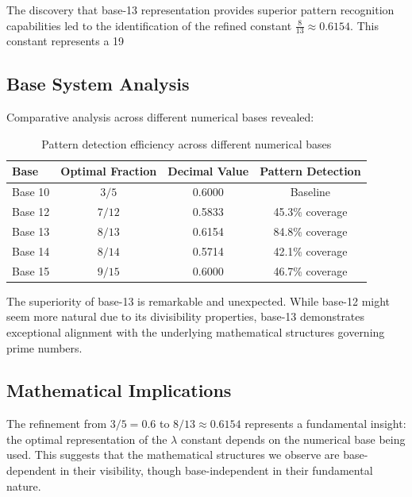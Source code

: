 \documentclass[12pt,a4paper]{report}
\newcommand{\base十三refined}{\frac{8}{13}}
\begin{document}
The discovery that base-13 representation provides superior pattern recognition capabilities led to the identification of the refined constant $\base十三refined \approx 0.6154$. This constant represents a 19%

\subsection{Base System Analysis}

Comparative analysis across different numerical bases revealed:

\begin{table}[h]
\centering
\begin{tabular}{|l|c|c|c|}
\hline
\textbf{Base} & \textbf{Optimal Fraction} & \textbf{Decimal Value} & \textbf{Pattern Detection} \\
\hline
Base 10 & $3/5$ & 0.6000 & Baseline \\
Base 12 & $7/12$ & 0.5833 & 45.3\% coverage \\
Base 13 & $8/13$ & 0.6154 & 84.8\% coverage \\
Base 14 & $8/14$ & 0.5714 & 42.1\% coverage \\
Base 15 & $9/15$ & 0.6000 & 46.7\% coverage \\
\hline
\end{tabular}
\caption{Pattern detection efficiency across different numerical bases}
\end{table}

The superiority of base-13 is remarkable and unexpected. While base-12 might seem more natural due to its divisibility properties, base-13 demonstrates exceptional alignment with the underlying mathematical structures governing prime numbers.

\subsection{Mathematical Implications}

The refinement from $3/5 = 0.6$ to $8/13 \approx 0.6154$ represents a fundamental insight: the optimal representation of the $\lambda$ constant depends on the numerical base being used. This suggests that the mathematical structures we observe are base-dependent in their visibility, though base-independent in their fundamental nature.
\end{document}
